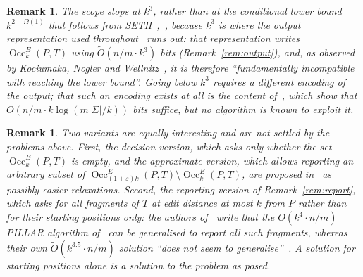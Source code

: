 \documentclass[10pt]{article}
\newtheorem{remark}[theorem]{Remark}
\newcommand{\Occ}{\operatorname{Occ}^E}
\newcommand{\PILLAR}{\textnormal{PILLAR}}
\newcommand{\Ot}{\widetilde{O}}
\begin{document}
\begin{remark}\label{rem:scope}
The scope stops at $k^3$, rather than at the conditional lower bound
$k^{2-\Omega(1)}$ that follows from SETH~\cite{BI18},~\cite[Section 1]{CKW22}, because $k^3$ is where the output
representation used throughout~\cite{CKW20,CKW22} runs out: that
representation writes $\Occ_k(P,T)$ using $\Ot(n/m\cdot k^3)$ bits
(Remark~\ref{rem:output}), and, as observed by Kociumaka, Nogler and
Wellnitz~\cite[Section 1]{KNW26}, it is therefore ``fundamentally incompatible
with reaching the lower bound''. Going below $k^3$ requires a different
encoding of the output; that such an encoding exists at all is the content
of~\cite{KNW24,KNW26}, which show that $O(n/m\cdot k\log(m|\Sigma|/k))$ bits
suffice, but no algorithm is known to exploit it.
\end{remark}

\begin{remark}\label{rem:variants}
Two variants are equally interesting and are not settled by the problems above.
First, the decision version, which asks only whether the set $\Occ_k(P,T)$ is
empty, and the approximate version, which allows reporting an arbitrary subset
of
$\Occ_{(1+\varepsilon)k}(P,T)\setminus\Occ_k(P,T)$, are proposed
in~\cite[Section 1.2]{CKW22} as possibly easier relaxations. Second, the
reporting version of Remark~\ref{rem:report}, which asks for all fragments of
$T$ at edit distance at most $k$ from $P$ rather than for their starting
positions only: the authors of~\cite{CKW22} write that the $O(k^4\cdot n/m)$
\PILLAR{} algorithm of~\cite{CKW20} can be generalised to report all such
fragments, whereas their own $\Ot(k^{3.5}\cdot n/m)$ solution ``does not seem to
generalise''~\cite[Section 1.2]{CKW22}. A solution for starting positions alone is a
solution to the problem as posed.
\end{remark}
\end{document}
